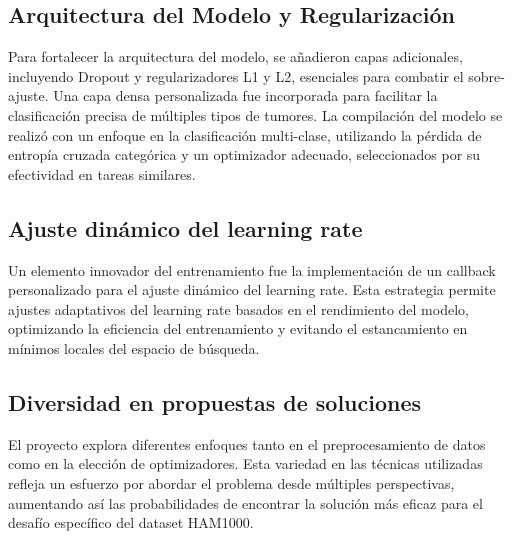 \subsection{Arquitectura del Modelo y Regularización}

Para fortalecer la arquitectura del modelo, se añadieron capas adicionales, incluyendo Dropout y regularizadores L1 y L2, esenciales para combatir el sobre-ajuste. Una capa densa personalizada fue incorporada para facilitar la clasificación precisa de múltiples tipos de tumores. La compilación del modelo se realizó con un enfoque en la clasificación multi-clase, utilizando la pérdida de entropía cruzada categórica y un optimizador adecuado, seleccionados por su efectividad en tareas similares.

\subsection{Ajuste dinámico del learning rate}

Un elemento innovador del entrenamiento fue la implementación de un callback personalizado para el ajuste dinámico del learning rate. Esta estrategia permite ajustes adaptativos del learning rate basados en el rendimiento del modelo, optimizando la eficiencia del entrenamiento y evitando el estancamiento en mínimos locales del espacio de búsqueda.

\subsection{Diversidad en propuestas de soluciones}

El proyecto explora diferentes enfoques tanto en el preprocesamiento de datos como en la elección de optimizadores. Esta variedad en las técnicas utilizadas refleja un esfuerzo por abordar el problema desde múltiples perspectivas, aumentando así las probabilidades de encontrar la solución más eficaz para el desafío específico del dataset HAM1000.